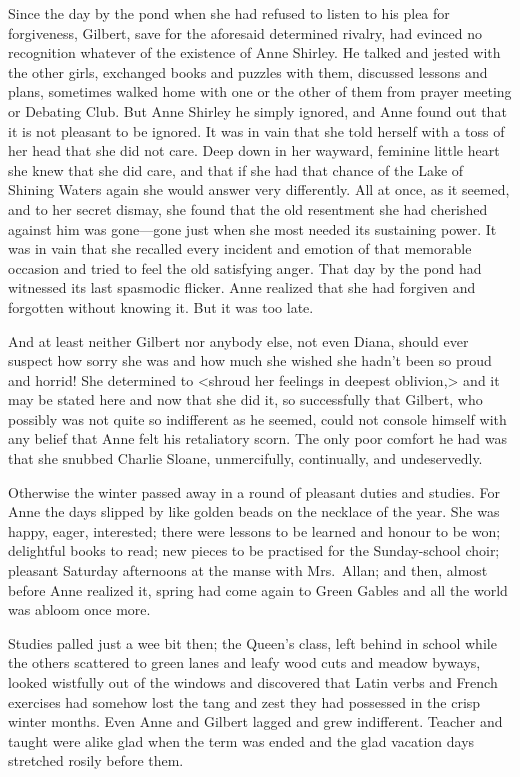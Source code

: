 Since the day by the pond when she had refused to listen to his plea for forgiveness, Gilbert, save for the aforesaid determined rivalry, had evinced no recognition whatever of the existence of Anne Shirley. He talked and jested with the other girls, exchanged books and puzzles with them, discussed lessons and plans, sometimes walked home with one or the other of them from prayer meeting or Debating Club. But Anne Shirley he simply ignored, and Anne found out that it is not pleasant to be ignored. It was in vain that she told herself with a toss of her head that she did not care. Deep down in her wayward, feminine little heart she knew that she did care, and that if she had that chance of the Lake of Shining Waters again she would answer very differently. All at once, as it seemed, and to her secret dismay, she found that the old resentment she had cherished against him was gone—gone just when she most needed its sustaining power. It was in vain that she recalled every incident and emotion of that memorable occasion and tried to feel the old satisfying anger. That day by the pond had witnessed its last spasmodic flicker. Anne realized that she had forgiven and forgotten without knowing it. But it was too late.

And at least neither Gilbert nor anybody else, not even Diana, should ever suspect how sorry she was and how much she wished she hadn't been so proud and horrid! She determined to <shroud her feelings in deepest oblivion,> and it may be stated here and now that she did it, so successfully that Gilbert, who possibly was not quite so indifferent as he seemed, could not console himself with any belief that Anne felt his retaliatory scorn. The only poor comfort he had was that she snubbed Charlie Sloane, unmercifully, continually, and undeservedly.

Otherwise the winter passed away in a round of pleasant duties and studies. For Anne the days slipped by like golden beads on the necklace of the year. She was happy, eager, interested; there were lessons to be learned and honour to be won; delightful books to read; new pieces to be practised for the Sunday-school choir; pleasant Saturday afternoons at the manse with Mrs.~Allan; and then, almost before Anne realized it, spring had come again to Green Gables and all the world was abloom once more.

Studies palled just a wee bit then; the Queen's class, left behind in school while the others scattered to green lanes and leafy wood cuts and meadow byways, looked wistfully out of the windows and discovered that Latin verbs and French exercises had somehow lost the tang and zest they had possessed in the crisp winter months. Even Anne and Gilbert lagged and grew indifferent. Teacher and taught were alike glad when the term was ended and the glad vacation days stretched rosily before them.

